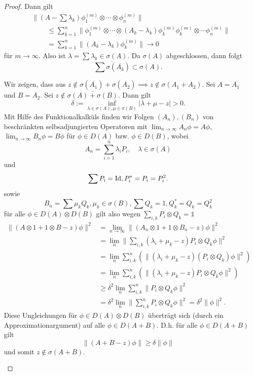 \documentclass{mycourse}
\begin{document}
\begin{proof}
Dann gilt %
\begin{align*}
&\|(A- \sum \lambda_k)  \phi_1^{(m)} \otimes  \cdots \otimes \phi_n^{(m)}\| \\
&\ \qquad\le \sum_{k=1}^n \| \phi_1^{(m)} \otimes \cdots \otimes (A_k-\lambda_k) \phi_k^{(m)} \phi_k^{(m)} \otimes \cdots \phi_n^{(m)}\|\\
&\ \qquad= \sum_{k=1}^n \| (A_k - \lambda_k) \phi^{(m)}_k \| \to 0
\end{align*}
für $m\to \infty$. Also ist $\lambda = \sum \lambda_k \in \sigma(A)$. Da $\sigma(A)$ abgeschlossen, dann folgt
\[
\overline{\sum \sigma (\overline{A_k})} \subset \sigma(A).
\] 
\begin{seg}[Umkehrung für $n=2$]
Wir zeigen, dass aus $z\not\in \sigma(\overline{A_1}) + \sigma(\overline{A_2}) \implies z\not\in \sigma(A_1 + A_2)$. Sei $A= \overline{A_1}$ und $B= \overline{A_2}$. Sei $z\not\in \overline{\sigma(A) + \sigma(B)}$. Dann gilt
\[
\delta := \inf_{\lambda\in \sigma(A), \mu \in \sigma(B)} |\lambda + \mu -z|>0.
\]
Mit Hilfe des Funktionalkalküls finden wir Folgen $(A_n), (B_n)$ von beschränkten selbsadjungierten Operatoren mit $\lim_{n\to \infty} A_n \phi = A \phi$, $\lim_{n\to \infty} B_n \phi = B\phi$ für $\phi \in D(A)$ bzw. $\phi \in D(B)$, wobei
\[
A_n = \sum_{i=1}^n \lambda_i P_i, \quad \lambda \in \sigma(A)
\]
und
\[
\sum P_i = \operatorname{Id}, P_i^* = P_i = P_i^2.
\]
sowie
\[
B_n = \sum \mu_k Q_k, \mu_k \in \sigma(B), \sum Q_k =1, Q_k^* = Q_k = Q_k^2
\]
für alle $\phi \in D(A) \otimes D(B)$ gilt also wegen $\sum_{i,k} P_i \otimes Q_k =\mathbb 1$
\begin{align*}
\| (A \otimes 1 + 1 \otimes B - z) \phi \|^2 &= \lim_{n\to \infty} \| (A_n \otimes 1 + 1 \otimes B_n -z) \phi\|^2 \\
&= \lim_{n} \| \sum_{i,k} (\lambda_i + \mu_k -z)  P_i \otimes Q_k \phi \|^2 \quad \\
&= \lim_{n} \sum_{i,k}^n ( \| (\lambda_i+ \mu_k -z) (P_i \otimes Q_k) \phi\|^2)\\
&= \lim_{n} \sum_{i,k}^n ( \|(\lambda_i + \mu_k-z) P_i \otimes Q_k \phi\|^2)\\
&\ge \delta^2 \lim_{n} \sum_{i,k}^n \|P_i \otimes Q_k \phi \|^2 \\
&= \delta^2 \lim_{n} \| \sum_{i,k}^n P_i \otimes Q_k \phi \|^2 = \delta^2 \|\phi \|^2.
\end{align*}
Diese Ungleichungen für $\phi \in D(A) \otimes D(B)$ überträgt sich (durch ein Approximationargument) auf alle $\phi \in D(A+B)$. D.h. für alle $\phi \in D(A+B)$ gilt
\[
\|(A+B-z) \phi \| \ge \delta \| \phi \|
\]
und somit $z\not\in \sigma(A+B)$.
\end{seg} %
\end{proof}
\end{document}

